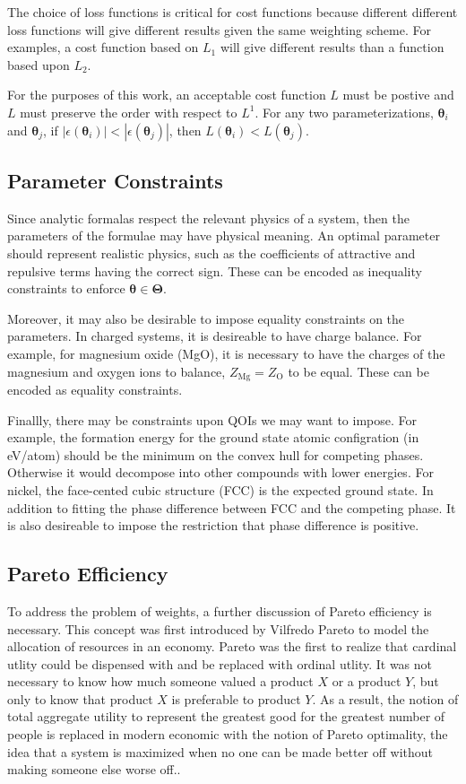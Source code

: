 The choice of loss functions is critical for cost functions because different different loss functions will give different results given the same weighting scheme.  For examples, a cost function based on $L_1$ will give different results than a function based upon $L_2$.

For the purposes of this work, an acceptable cost function $L$ must be postive and $L$ must preserve the order with respect to $L^1$.  For any two parameterizations, $\bm{\theta}_i$ and $\bm{\theta}_j$, if $|\epsilon(\bm{\theta}_i)| < |\epsilon(\bm{\theta}_j)|$, then $L(\bm{\theta}_i) < L(\bm{\theta}_j)$.

\subsection{Parameter Constraints}

Since analytic formalas respect the relevant physics of a system, then the parameters of the formulae may have physical meaning.  An optimal parameter should represent realistic physics, such as the coefficients of attractive and repulsive terms having the correct sign.  These can be encoded as inequality constraints to enforce $\bm{\theta} \in \bm{\Theta}$.

Moreover, it may also be desirable to impose equality constraints on the parameters.  In charged systems, it is desireable to have charge balance.  For example, for magnesium oxide (MgO), it is necessary to have the charges of the magnesium and oxygen ions to balance, $Z_{\text{Mg}} = Z_{\text{O}}$ to be equal.  These can be encoded as equality constraints.

Finallly, there may be constraints upon QOIs we may want to impose.  For example, the formation energy for the ground state atomic configration (in eV/atom) should be the minimum on the convex hull for competing phases.  Otherwise it would decompose into other compounds with lower energies.  For nickel, the face-cented cubic structure (FCC) is the expected ground state.  In addition to fitting the phase difference between FCC and the competing phase.  It is also desireable to impose the restriction that phase difference is positive.

\subsection{Pareto Efficiency}

To address the problem of weights, a further discussion of Pareto efficiency is necessary. This concept was first introduced by Vilfredo Pareto to model the allocation of resources in an economy\cite{pareto1897_pareto}.  Pareto was the first to realize that cardinal utlity could be dispensed with and be replaced with ordinal utlity\cite{aspers2001_pareto}.  It was not necessary to know how much someone valued a product $X$ or a product $Y$, but only to know that product $X$ is preferable to product $Y$.  As a result, the notion of total aggregate utility to represent the greatest good for the greatest number of people is replaced in modern economic with the notion of Pareto optimality, the idea that a system is maximized when no one can be made better off without making someone else worse off.\cite{mathur1991_pareto}.

